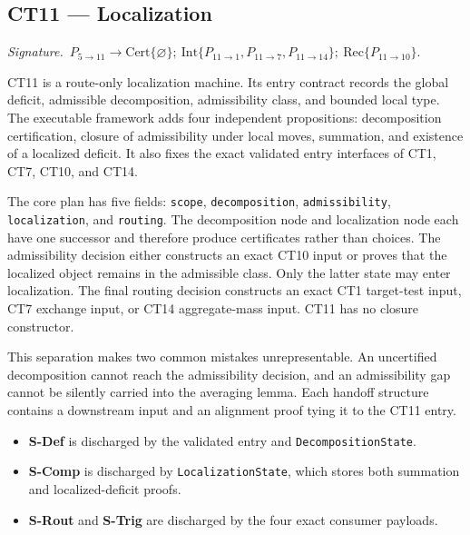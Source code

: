 \documentclass[
  11pt,
]{article}
\providecommand{\tightlist}{%
  \setlength{\itemsep}{0pt}\setlength{\parskip}{0pt}}
\theoremstyle{definition}
\newcommand{\ctsignature}[1]{\par\noindent\emph{Signature.}\ #1\par\medskip}
\newcommand{\ctcert}[1]{\mathrm{Cert}\{#1\}}
\newcommand{\ctint}[1]{\mathrm{Int}\{#1\}}
\newcommand{\ctrec}[1]{\mathrm{Rec}\{#1\}}
\newcommand{\ctnone}{\varnothing}
\begin{document}
\subsection{CT11 --- Localization}\label{ct:11}\label{additivity-and-the-localization-lemma}
\ctsignature{\(P_{5\to11}\to \ctcert{\ctnone};\ \ctint{P_{11\to1},P_{11\to7},P_{11\to14}};\ \ctrec{P_{11\to10}}.\)}

CT11 is a route-only localization machine.  Its entry contract records the
global deficit, admissible decomposition, admissibility class, and bounded
local type.  The executable framework adds four independent propositions:
decomposition certification, closure of admissibility under local moves,
summation, and existence of a localized deficit.  It also fixes the exact
validated entry interfaces of CT1, CT7, CT10, and CT14.

The core plan has five fields: \texttt{scope}, \texttt{decomposition},
\texttt{admissibility}, \texttt{localization}, and \texttt{routing}.  The
decomposition node and localization node each have one successor and therefore
produce certificates rather than choices.  The admissibility decision either
constructs an exact CT10 input or proves that the localized object remains in
the admissible class.  Only the latter state may enter localization.  The final
routing decision constructs an exact CT1 target-test input, CT7 exchange input,
or CT14 aggregate-mass input.  CT11 has no closure constructor.

This separation makes two common mistakes unrepresentable.  An uncertified
decomposition cannot reach the admissibility decision, and an admissibility gap
cannot be silently carried into the averaging lemma.  Each handoff structure
contains a downstream input and an alignment proof tying it to the CT11 entry.

\begin{itemize}
\tightlist
\item \textbf{S-Def} is discharged by the validated entry and \texttt{DecompositionState}.
\item \textbf{S-Comp} is discharged by \texttt{LocalizationState}, which stores both summation and localized-deficit proofs.
\item \textbf{S-Rout} and \textbf{S-Trig} are discharged by the four exact consumer payloads.
\end{itemize}
\end{document}
